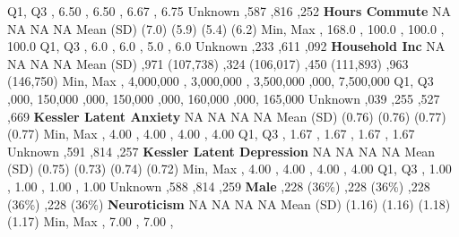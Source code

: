 \documentclass[
  single column]{article}
\begin{document}
\begin{table}
{\textbar Q1, Q3 , 6.50 , 6.50 , 6.67
, 6.75 \textbar{} \textbar Unknown  ,587
,816 ,252 \textbar{} \textbar{}\textbf{Hours
Commute} \textbar NA \textbar NA \textbar NA \textbar NA \textbar{}
\textbar Mean (SD)  (7.0)  (5.9)  (5.4)
 (6.2) \textbar{} \textbar Min, Max , 168.0
, 100.0 , 100.0 , 100.0 \textbar{}
\textbar Q1, Q3 , 6.0 , 6.0 , 5.0
, 6.0 \textbar{} \textbar Unknown  ,233
,611 ,092 \textbar{} \textbar{}\textbf{Household
Inc} \textbar NA \textbar NA \textbar NA \textbar NA \textbar{}
\textbar Mean (SD) ,971 (107,738) ,324 (106,017)
,450 (111,893) ,963 (146,750) \textbar{}
\textbar Min, Max , 4,000,000 , 3,000,000 ,
3,500,000 ,000, 7,500,000 \textbar{} \textbar Q1, Q3
,000, 150,000 ,000, 150,000 ,000, 160,000
,000, 165,000 \textbar{} \textbar Unknown ,039
,255 ,527 ,669 \textbar{}
\textbar{}\textbf{Kessler Latent Anxiety} \textbar NA \textbar NA
\textbar NA \textbar NA \textbar{} \textbar Mean (SD) 
(0.76)  (0.76)  (0.77)  (0.77)
\textbar{} \textbar Min, Max , 4.00 , 4.00
, 4.00 , 4.00 \textbar{} \textbar Q1, Q3
, 1.67 , 1.67 , 1.67 ,
1.67 \textbar{} \textbar Unknown  ,591
,814 ,257 \textbar{} \textbar{}\textbf{Kessler
Latent Depression} \textbar NA \textbar NA \textbar NA \textbar NA
\textbar{} \textbar Mean (SD)  (0.75)  (0.73)
 (0.74)  (0.72) \textbar{} \textbar Min, Max
, 4.00 , 4.00 , 4.00 ,
4.00 \textbar{} \textbar Q1, Q3 , 1.00 , 1.00
, 1.00 , 1.00 \textbar{} \textbar Unknown
 ,588 ,814 ,259 \textbar{}
\textbar{}\textbf{Male} ,228 (36\%) ,228 (36\%)
,228 (36\%) ,228 (36\%) \textbar{}
\textbar{}\textbf{Neuroticism} \textbar NA \textbar NA \textbar NA
\textbar NA \textbar{} \textbar Mean (SD)  (1.16)
 (1.16)  (1.18)  (1.17) \textbar{}
\textbar Min, Max , 7.00 , 7.00 ,
}
\end{table}
\end{document}
